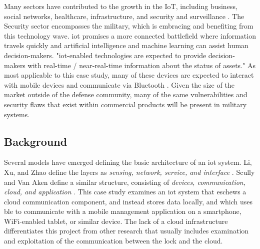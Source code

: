 \documentclass[conference]{IEEEtran}
\begin{document}
Many sectors have contributed to the growth in the IoT, including business, social networks, healthcare, infrastructure, and security and surveillance \cite{Li2015}. The Security sector encompasses the military, which is embracing and benefiting from this technology wave. \gls{iot} promises a more connected battlefield where information travels quickly and artificial intelligence and machine learning can assist human decision-makers. "\gls{iot}-enabled technologies are expected to provide decision-makers with real-time / near-real-time information about the status of assets." As most applicable to this case study, many of these devices are expected to interact with mobile devices and communicate via Bluetooth  \cite{Miller}. Given the size of the market outside of the defense community, many of the same vulnerabilities and security flaws that exist within commercial products will be present in military systems. 

\subsection{Background}

Several models have emerged defining the basic architecture of an \gls{iot} system. Li, Xu, and Zhao define the layers as \textit{sensing, network, service, and interface} \cite{Li2015}. Scully and Van Aken define a similar structure, consisting of \textit{devices, communication, cloud, and application}  \cite{Scully2017}. This case study examines an \gls{iot} system that eschews a cloud communication component, and instead stores data locally, and which uses \gls{ble} to communicate with a mobile management application on a smartphone, WiFi-enabled tablet, or similar device.  The lack of a cloud infrastructure differentiates this project from other research that usually includes examination and exploitation of the communication between the lock and the cloud. 

\bigskip
\end{document}
